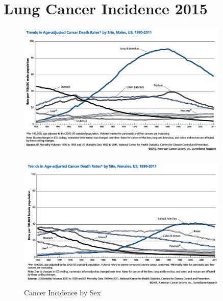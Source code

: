 \newpage
\section*{Lung Cancer Incidence 2015}

\begin{figure}[H]
  \vspace*{\fill}
  \centering
  \includegraphics[width=0.9\textwidth]{./figures/supplementary/acsMenLungCancer.png}\label{fig:acsMen}\par\vfill
  \includegraphics[width=0.9\textwidth]{./figures/supplementary/acsWomenLungCancer.png}
  \caption{Cancer Incidence by Sex \citep{siegel2015}}\label{fig:acsWomen}
\end{figure}


